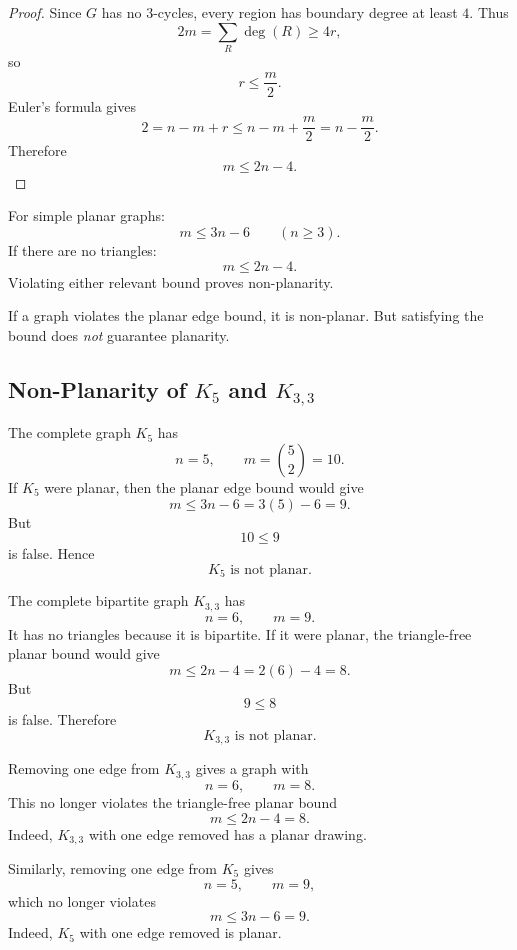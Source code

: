 \begin{proof}
Since \(G\) has no \(3\)-cycles, every region has boundary degree at least \(4\). Thus
\[
2m=\sum_R\deg(R)\ge 4r,
\]
so
\[
r\le \frac{m}{2}.
\]
Euler's formula gives
\[
2=n-m+r\le n-m+\frac{m}{2}=n-\frac{m}{2}.
\]
Therefore
\[
m\le 2n-4.
\]
\end{proof}

\begin{keyformula}[title={Fast planar non-planarity tests}]
For simple planar graphs:
\[
m\le 3n-6
\qquad (n\ge 3).
\]
If there are no triangles:
\[
m\le 2n-4.
\]
Violating either relevant bound proves non-planarity.
\end{keyformula}

\begin{commonmistake}[title={These inequalities are one-way tests}]
If a graph violates the planar edge bound, it is non-planar. But satisfying the bound does \emph{not} guarantee planarity.
\end{commonmistake}

\subsection{Non-Planarity of \(K_5\) and \(K_{3,3}\)}

\begin{examplebox}[title={Non-planarity of \(K_5\)}]
The complete graph \(K_5\) has
\[
n=5,\qquad m=\binom{5}{2}=10.
\]
If \(K_5\) were planar, then the planar edge bound would give
\[
m\le 3n-6=3(5)-6=9.
\]
But
\[
10\le 9
\]
is false. Hence
\[
\boxed{K_5\text{ is not planar}.}
\]
\end{examplebox}

\begin{examplebox}[title={Non-planarity of \(K_{3,3}\)}]
The complete bipartite graph \(K_{3,3}\) has
\[
n=6,\qquad m=9.
\]
It has no triangles because it is bipartite. If it were planar, the triangle-free planar bound would give
\[
m\le 2n-4=2(6)-4=8.
\]
But
\[
9\le 8
\]
is false. Therefore
\[
\boxed{K_{3,3}\text{ is not planar}.}
\]
\end{examplebox}

\begin{examplebox}[title={Tutorial 9, Question 5}]
Removing one edge from \(K_{3,3}\) gives a graph with
\[
n=6,\qquad m=8.
\]
This no longer violates the triangle-free planar bound
\[
m\le 2n-4=8.
\]
Indeed, \(K_{3,3}\) with one edge removed has a planar drawing.

Similarly, removing one edge from \(K_5\) gives
\[
n=5,\qquad m=9,
\]
which no longer violates
\[
m\le 3n-6=9.
\]
Indeed, \(K_5\) with one edge removed is planar.
\end{examplebox}

